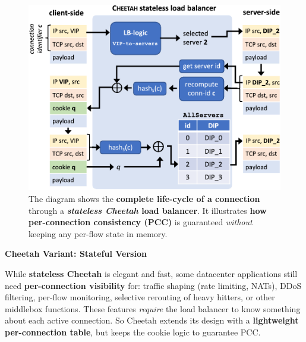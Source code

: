 \begin{figure}[!htp]
    \centering
    \includegraphics[width=\textwidth]{img/cheetah-lb.pdf}
    \caption{The diagram \cite{barbette2020high} shows the \textbf{complete life-cycle of a connection} through a \textbf{\emph{stateless Cheetah} load balancer}. It illustrates \textbf{how per-connection consistency (PCC)} is guaranteed \emph{without} keeping any per-flow state in memory. }
\end{figure}

\newpage

\begin{flushleft}
    \textcolor{Green3}{ \textbf{Cheetah Variant: Stateful Version}}
\end{flushleft}
While \textbf{stateless Cheetah} is elegant and fast, some datacenter applications still need \textbf{per-connection visibility} for: traffic shaping (rate limiting, NATs), DDoS filtering, per-flow monitoring, selective rerouting of heavy hitters, or other middlebox functions. These features \emph{require} the load balancer to know something about each active connection. So Cheetah extends its design with a \textbf{lightweight per-connection table}, but keeps the cookie logic to guarantee PCC.

